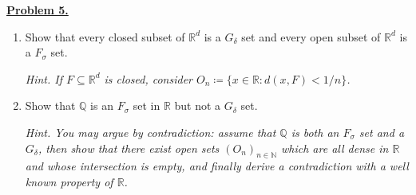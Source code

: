 \noindent \underline{\textbf{Problem 5.}}
\begin{enumerate}
	\item Show that every closed subset of \( \mathbb{R}^{d}  \) is a \( G_\delta  \) set and every open subset of \( \mathbb{R}^{d}  \) is a \( F_\sigma  \) set.

\emph{Hint. If \( F \subseteq \mathbb{R}^{d}  \) is closed, consider \( O_n \coloneqq \{ x \in \mathbb{R}: d(x,F) < 1/n \}  \).}

\item Show that \( \mathbb{Q}  \) is an \( F_\sigma  \) set in \( \mathbb{R} \) but not a \( G_\delta  \) set.

	\emph{Hint. You may argue by contradiction: assume that \( \mathbb{Q}  \) is both an \( F_\sigma  \) set and a \( G_\delta  \), then show that there exist open sets \( (O_n)_{n \in \mathbb{N} }  \) which are all dense in \( \mathbb{R} \) and whose intersection is empty, and finally derive a contradiction with a well known property of \( \mathbb{R} \).}
\end{enumerate}
